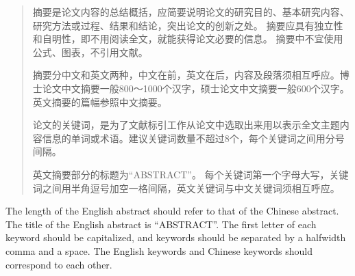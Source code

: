 

\begin{abstract}
  摘要是论文内容的总结概括，应简要说明论文的研究目的、基本研究内容、研究方法或过程、结果和结论，突出论文的创新之处。
  摘要应具有独立性和自明性，即不用阅读全文，就能获得论文必要的信息。
  摘要中不宜使用公式、图表，不引用文献。

  摘要分中文和英文两种，中文在前，英文在后，内容及段落须相互呼应。博士论文中文摘要一般800～1000个汉字，硕士论文中文摘要一般600个汉字。
  英文摘要的篇幅参照中文摘要。

  论文的关键词，是为了文献标引工作从论文中选取出来用以表示全文主题内容信息的单词或术语。建议关键词数量不超过8个，每个关键词之间用分号间隔。

  英文摘要部分的标题为“ABSTRACT”。
  每个关键词第一个字母大写，关键词之间用半角逗号加空一格间隔，英文关键词与中文关键词须相互呼应。

\end{abstract}

\begin{abstract*}
  The length of the English abstract should refer to that of the Chinese abstract.
  The title of the English abstract is “ABSTRACT”.
  The first letter of each keyword should be capitalized, and keywords should be separated by a halfwidth comma and a space.
  The English keywords and Chinese keywords should correspond to each other.
\end{abstract*}
